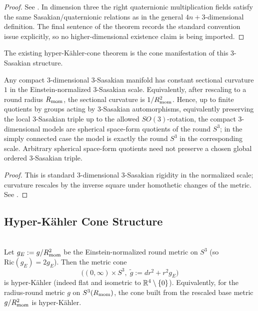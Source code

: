 \documentclass[11pt]{article}
\begin{document}
\begin{proof}
See \cite{boyer2008sasakian,BoyerGalicki1999}. In dimension three the right
quaternionic multiplication fields satisfy the same Sasakian/quaternionic
relations as in the general \(4n+3\)-dimensional definition.  The final sentence
of the theorem records the standard convention issue explicitly, so no
higher-dimensional existence claim is being imported.
\end{proof}

\begin{remark}
The existing hyper-K\"ahler-cone theorem is the cone manifestation of this
3-Sasakian structure.
\end{remark}

\begin{corollary}
\label{p1:cor:3sasakian-rigidity}
Any compact \(3\)-dimensional \(3\)-Sasakian manifold has constant sectional curvature \(1\) in the Einstein-normalized \(3\)-Sasakian scale. Equivalently, after rescaling to a round radius \(R_{\mathrm{mom}}\), the sectional curvature is \(1/R_{\mathrm{mom}}^2\).
Hence, up to finite quotients by groups acting by \(3\)-Sasakian automorphisms, equivalently preserving the local \(3\)-Sasakian triple up to the allowed \(SO(3)\)-rotation, the compact \(3\)-dimensional models are spherical space-form quotients of the round \(S^3\); in the simply connected case the model is exactly the round \(S^3\) in the corresponding scale. Arbitrary spherical space-form quotients need not preserve a chosen global ordered \(3\)-Sasakian triple.
\end{corollary}

\begin{proof}
This is standard \(3\)-dimensional \(3\)-Sasakian rigidity in the normalized scale; curvature rescales by the inverse square under homothetic changes of the metric. See \cite{boyer2008sasakian,BoyerGalicki1999}.
\end{proof}


\subsection{Hyper-Kähler Cone Structure}
\label{p1:subsec:hyperkahler-proof}

\begin{theorem}
\label{p1:thm:hyperkahler-cone}
\mbox{}\\[6pt] 
Let $g_E := g/R_{\mathrm{mom}}^2$ be the Einstein-normalized round metric on $S^3$ (so $\mathrm{Ric}(g_E)=2g_E$). Then the metric cone
\[
\bigl((0,\infty)\times S^3,\;\tilde g:=dr^2+r^2 g_E\bigr)
\]
is hyper-Kähler (indeed flat and isometric to $\mathbb{R}^4\setminus\{0\}$). Equivalently, for the radius-\Rmom round metric $g$ on $S^3(R_{\mathrm{mom}})$, the cone built from the rescaled base metric $g/R_{\mathrm{mom}}^2$ is hyper-Kähler.
\end{theorem}
\end{document}
